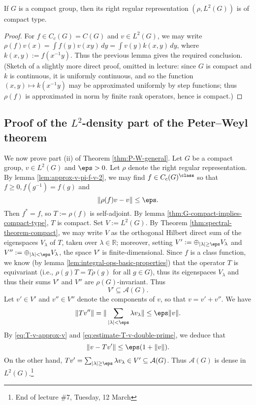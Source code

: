 \documentclass[reqno]{amsart} 
\begin{document}
\begin{lemma}\label{thm:G-compact-implies-compact-type}
  If $G$ is a compact group, then its right regular representation $(\rho,L^2(G))$ is of compact type.
\end{lemma}
\begin{proof}
  For $f \in C_c(G) = C(G)$ and $v \in L^2(G)$, we may write $\rho(f) v(x) = \int f(y) v(x y) \, d y = \int v(y) k(x,y) \, d y$, where $k(x,y) := f(x^{-1} y)$.  Thus the previous lemma gives the required conclusion.  (Sketch of a slightly more direct proof, omitted in lecture: since $G$ is compact and $k$ is continuous, it is uniformly continuous, and so the function $(x,y) \mapsto k(x^{-1} y)$ may be approximated uniformly by step functions; thus $\rho(f)$ is approximated in norm by finite rank operators, hence is compact.)
\end{proof}

\subsection{Proof of the \texorpdfstring{$L^2$}{L2}-density
  part of the Peter--Weyl theorem}
We now prove part (ii) of Theorem \ref{thm:P-W-general}.  Let $G$ be a compact group, $v \in L^2(G)$ and $\eps > 0$.  Let $\rho$ denote the right regular representation.  By lemma \ref{lem:approx-v-pi-f-v-2}, we may find $f \in C_c(G)^{\class}$ so that $f \geq 0, f(g^{-1}) = f(g)$ and
\begin{equation}\label{eq:T-v-approx-v}
  \|\rho(f) v - v\| \leq \eps.
\end{equation}
Then $f^* = f$, so $T := \rho(f)$ is self-adjoint.  By lemma \ref{thm:G-compact-implies-compact-type}, $T$ is compact.  Set $V := L^2(G)$.  By Theorem \ref{thm:spectral-theorem-compact}, we may write $V$ as the orthogonal Hilbert direct sum of the eigenspaces $V_\lambda$ of $T$, taken over $\lambda \in \mathbb{R}$; moreover, setting $V' := \oplus_{|\lambda| \geq \eps} V_\lambda$ and $V'' := \oplus_{|\lambda| < \eps} V_\lambda$, the space $V'$ is finite-dimensional.  Since $f$ is a class function, we know (by lemma \ref{lem:integral-ops-basic-properties}) that the operator $T$ is equivariant (i.e., $\rho(g) T = T \rho(g)$ for all $g \in G$), thus its eigenspaces $V_\lambda$ and thus their sums $V'$ and $V''$ are $\rho(G)$-invariant.  Thus
\begin{equation}\label{eq:V'-finite}
  V' \subseteq \mathcal{A}(G).
\end{equation}
Let $v' \in V'$ and $v'' \in V''$ denote the components of $v$, so that $v = v' + v''$.  We have
\begin{equation}\label{eq:estimate-T-v-double-prime}
  \|T v''\|
  = \|\sum_{|\lambda| < \eps } \lambda v_\lambda \|
  \leq \eps \|v\|.
\end{equation}
By \eqref{eq:T-v-approx-v} and \eqref{eq:estimate-T-v-double-prime}, we deduce that
\begin{equation}\label{eq:}
  \|v - T v'\| \leq \eps (1 + \|v\|).
\end{equation}
On the other hand, $T v' = \sum_{|\lambda| \geq \eps} \lambda v_\lambda \in V' \subseteq \mathcal{A}(G)$.  Thus $\mathcal{A}(G)$ is dense in $L^2(G)$.\footnote{End of lecture \#7, Tuesday, 12 March}
\end{document}
